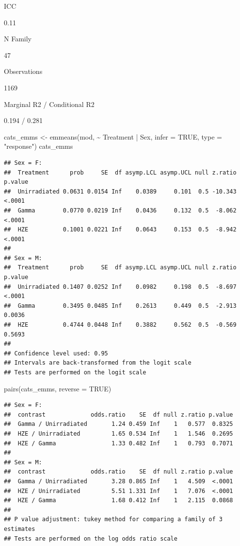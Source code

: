 \documentclass[
]{article}
\newenvironment{Shaded}{\begin{snugshade}}{\end{snugshade}}
\newcommand{\AttributeTok}[1]{\textcolor[rgb]{0.77,0.63,0.00}{#1}}
\newcommand{\ConstantTok}[1]{\textcolor[rgb]{0.00,0.00,0.00}{#1}}
\newcommand{\FunctionTok}[1]{\textcolor[rgb]{0.00,0.00,0.00}{#1}}
\newcommand{\NormalTok}[1]{#1}
\newcommand{\OtherTok}[1]{\textcolor[rgb]{0.56,0.35,0.01}{#1}}
\newcommand{\SpecialCharTok}[1]{\textcolor[rgb]{0.00,0.00,0.00}{#1}}
\newcommand{\StringTok}[1]{\textcolor[rgb]{0.31,0.60,0.02}{#1}}
\begin{document}
ICC

0.11

N Family

47

Observations

1169

Marginal R2 / Conditional R2

0.194 / 0.281

\begin{Shaded}
\begin{Highlighting}[]
\NormalTok{cats\_emms }\OtherTok{\textless{}{-}} \FunctionTok{emmeans}\NormalTok{(mod, }\SpecialCharTok{\textasciitilde{}}\NormalTok{ Treatment }\SpecialCharTok{|}\NormalTok{ Sex, }\AttributeTok{infer =} \ConstantTok{TRUE}\NormalTok{, }\AttributeTok{type =} \StringTok{"response"}\NormalTok{)}
\NormalTok{cats\_emms}
\end{Highlighting}
\end{Shaded}

\begin{verbatim}
## Sex = F:
##  Treatment      prob     SE  df asymp.LCL asymp.UCL null z.ratio p.value
##  Unirradiated 0.0631 0.0154 Inf    0.0389     0.101  0.5 -10.343  <.0001
##  Gamma        0.0770 0.0219 Inf    0.0436     0.132  0.5  -8.062  <.0001
##  HZE          0.1001 0.0221 Inf    0.0643     0.153  0.5  -8.942  <.0001
## 
## Sex = M:
##  Treatment      prob     SE  df asymp.LCL asymp.UCL null z.ratio p.value
##  Unirradiated 0.1407 0.0252 Inf    0.0982     0.198  0.5  -8.697  <.0001
##  Gamma        0.3495 0.0485 Inf    0.2613     0.449  0.5  -2.913  0.0036
##  HZE          0.4744 0.0448 Inf    0.3882     0.562  0.5  -0.569  0.5693
## 
## Confidence level used: 0.95 
## Intervals are back-transformed from the logit scale 
## Tests are performed on the logit scale
\end{verbatim}

\begin{Shaded}
\begin{Highlighting}[]
\FunctionTok{pairs}\NormalTok{(cats\_emms, }\AttributeTok{reverse =} \ConstantTok{TRUE}\NormalTok{)}
\end{Highlighting}
\end{Shaded}

\begin{verbatim}
## Sex = F:
##  contrast             odds.ratio    SE  df null z.ratio p.value
##  Gamma / Unirradiated       1.24 0.459 Inf    1   0.577  0.8325
##  HZE / Unirradiated         1.65 0.534 Inf    1   1.546  0.2695
##  HZE / Gamma                1.33 0.482 Inf    1   0.793  0.7071
## 
## Sex = M:
##  contrast             odds.ratio    SE  df null z.ratio p.value
##  Gamma / Unirradiated       3.28 0.865 Inf    1   4.509  <.0001
##  HZE / Unirradiated         5.51 1.331 Inf    1   7.076  <.0001
##  HZE / Gamma                1.68 0.412 Inf    1   2.115  0.0868
## 
## P value adjustment: tukey method for comparing a family of 3 estimates 
## Tests are performed on the log odds ratio scale
\end{verbatim}
\end{document}
